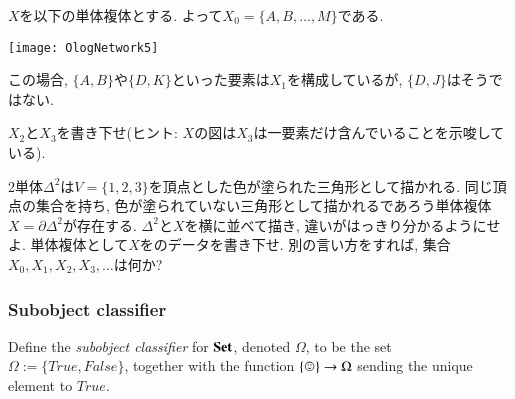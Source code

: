 \begin{exercise}
$X$を以下の単体複体とする. よって$X_0=\{A,B,\ldots,M\}$である.
\begin{center}
\texttt{[image: OlogNetwork5]}
\end{center} 
この場合, $\{A,B\}$や$\{D,K\}$といった要素は$X_1$を構成しているが, $\{D,J\}$はそうではない.

$X_2$と$X_3$を書き下せ(ヒント: $X$の図は$X_3$は一要素だけ含んでいることを示唆している).
\end{exercise}

\begin{exercise}
2単体$\Delta^2$は$V=\{1,2,3\}$を頂点とした色が塗られた三角形として描かれる. 同じ頂点の集合を持ち, 色が塗られていない三角形として描かれるであろう単体複体$X=\partial\Delta^2$が存在する.
\sexc $\Delta^2$と$X$を横に並べて描き, 違いがはっきり分かるようにせよ.
\next 単体複体として$X$をのデータを書き下せ. 別の言い方をすれば, 集合$X_0, X_1, X_2, X_3,\ldots$は何か?
\endsexc
\end{exercise}


\subsubsection{Subobject classifier}

\begin{definition}\label{def:subobject classifier}

Define the {\em subobject classifier} for ${\bf Set}$, denoted $\Omega$, to be the set $\Omega:=\{True,False\}$, together with the function $\singleton\to\Omega$ sending the unique element to $True$.

\end{definition}


